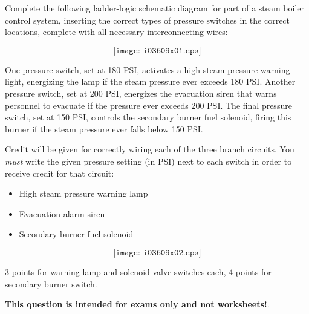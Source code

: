 

Complete the following ladder-logic schematic diagram for part of a steam boiler control system, inserting the correct types of pressure switches in the correct locations, complete with all necessary interconnecting wires:

$$\texttt{[image: i03609x01.eps]}$$

One pressure switch, set at 180 PSI, activates a high steam pressure warning light, energizing the lamp if the steam pressure ever exceeds 180 PSI.  Another pressure switch, set at 200 PSI, energizes the evacuation siren that warns personnel to evacuate if the pressure ever exceeds 200 PSI.  The final pressure switch, set at 150 PSI, controls the secondary burner fuel solenoid, firing this burner if the steam pressure ever falls below 150 PSI.

\vskip 10pt

\noindent
Credit will be given for correctly wiring each of the three branch circuits.  You {\it must} write the given pressure setting (in PSI) next to each switch in order to receive credit for that circuit:

\begin{itemize}
\item{} High steam pressure warning lamp
\item{} Evacuation alarm siren
\item{} Secondary burner fuel solenoid
\end{itemize}







$$\texttt{[image: i03609x02.eps]}$$

3 points for warning lamp and solenoid valve switches each, 4 points for secondary burner switch.







{\bf This question is intended for exams only and not worksheets!}.



